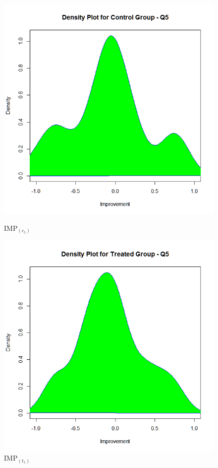 \begin{figure}
	\centering
	\begin{minipage}{.5\textwidth}
		\centering
		\includegraphics[width=1\linewidth]{figures/Imp_Control-q5}
		\caption{IMP$_{(c_5)}$}
		\label{fig:Imp_Control-q5}
	\end{minipage}%
	\begin{minipage}{.5\textwidth}
		\centering
		\includegraphics[width=1\linewidth]{figures/Imp_Treated-q5}
		\caption{IMP$_{(t_5)}$}
		\label{fig:Imp_Treated-q5}
	\end{minipage}
\end{figure}

